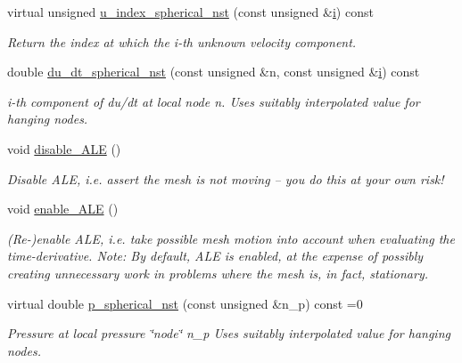 \begin{DoxyCompactItemize}
virtual unsigned \hyperlink{classoomph_1_1SphericalNavierStokesEquations_a2f269e20874a87df919cc4ece4b05fe5}{u\+\_\+index\+\_\+spherical\+\_\+nst} (const unsigned \&\hyperlink{cfortran_8h_adb50e893b86b3e55e751a42eab3cba82}{i}) const
\begin{DoxyCompactList}\small\item\em Return the index at which the i-\/th unknown velocity component. \end{DoxyCompactList}\item 
double \hyperlink{classoomph_1_1SphericalNavierStokesEquations_a6f9ce7398b2f2a767fddc7473046c674}{du\+\_\+dt\+\_\+spherical\+\_\+nst} (const unsigned \&n, const unsigned \&\hyperlink{cfortran_8h_adb50e893b86b3e55e751a42eab3cba82}{i}) const
\begin{DoxyCompactList}\small\item\em i-\/th component of du/dt at local node n. Uses suitably interpolated value for hanging nodes. \end{DoxyCompactList}\item 
void \hyperlink{classoomph_1_1SphericalNavierStokesEquations_a88010a11c69e6d5f189f5ce24e6c70da}{disable\+\_\+\+A\+LE} ()
\begin{DoxyCompactList}\small\item\em Disable A\+LE, i.\+e. assert the mesh is not moving -- you do this at your own risk! \end{DoxyCompactList}\item 
void \hyperlink{classoomph_1_1SphericalNavierStokesEquations_af0dcacf87c6c58d640a280603a992bd6}{enable\+\_\+\+A\+LE} ()
\begin{DoxyCompactList}\small\item\em (Re-\/)enable A\+LE, i.\+e. take possible mesh motion into account when evaluating the time-\/derivative. Note\+: By default, A\+LE is enabled, at the expense of possibly creating unnecessary work in problems where the mesh is, in fact, stationary. \end{DoxyCompactList}\item 
virtual double \hyperlink{classoomph_1_1SphericalNavierStokesEquations_a5b50d547e5a2ad5896dc9612e2bb4176}{p\+\_\+spherical\+\_\+nst} (const unsigned \&n\+\_\+p) const =0
\begin{DoxyCompactList}\small\item\em Pressure at local pressure \char`\"{}node\char`\"{} n\+\_\+p Uses suitably interpolated value for hanging nodes. \end{DoxyCompactList}\item 

\end{DoxyCompactItemize}
